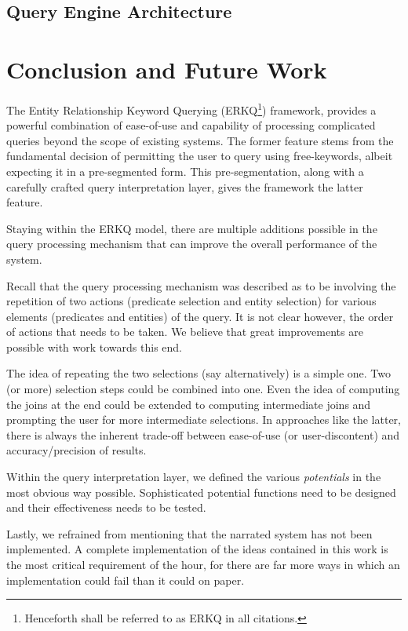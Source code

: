 \documentclass[a4paper, twoside, 12pt]{report}
\begin{document}
\section{Query Engine Architecture}


\chapter{Conclusion and Future Work}

The Entity Relationship Keyword Querying (ERKQ\footnote{Henceforth shall be referred to as ERKQ in all citations.}) framework, provides a powerful combination of ease-of-use and capability of processing complicated queries beyond the scope of existing systems. The former feature stems from the fundamental decision of permitting the user to query using free-keywords, albeit expecting it in a pre-segmented form. This pre-segmentation, along with a carefully crafted query interpretation layer, gives the framework the latter feature.

Staying within the ERKQ model, there are multiple additions possible in the query processing mechanism that can improve the overall performance of the system.

Recall that the query processing mechanism was described as to be involving the repetition of two actions (predicate selection and entity selection) for various elements (predicates and entities) of the query. It is not clear however, the order of actions that needs to be taken. We believe that great improvements are possible with work towards this end.

The idea of repeating the two selections (say alternatively) is a simple one. Two (or more) selection steps could be combined into one. Even the idea of computing the joins at the end could be extended to computing intermediate joins and prompting the user for more intermediate selections. In approaches like the latter, there is always the inherent trade-off between ease-of-use (or user-discontent) and accuracy/precision of results.

Within the query interpretation layer, we defined the various \emph{potentials} in the most obvious way possible. Sophisticated potential functions need to be designed and their effectiveness needs to be tested.

Lastly, we refrained from mentioning that the narrated system has not been implemented. A complete implementation of the ideas contained in this work is the most critical requirement of the hour, for there are far more ways in which an implementation could fail than it could on paper.



\end{document}
